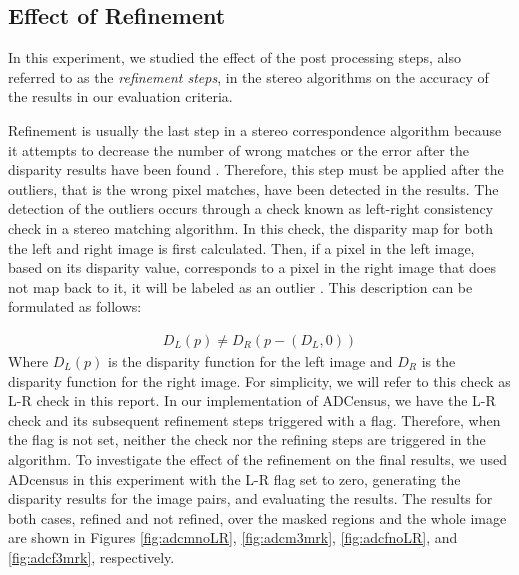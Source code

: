\subsection{Effect of Refinement}
In this experiment, we studied the effect of the post processing steps, also referred to as the \textit{refinement steps}, 
in the stereo algorithms on the accuracy of the results in our evaluation criteria. 

Refinement is usually the last step in a stereo correspondence algorithm because it attempts to decrease the 
number of wrong matches or the error after the disparity results have been found \cite{sch02}. Therefore, this step must be applied after the outliers, that is the wrong pixel matches, 
have been detected in the results.
The detection of the outliers occurs through a check known as left-right consistency check in a stereo matching algorithm. In this check, the disparity map for both
the left and right image is first calculated. Then, if a pixel in the left image, based on its disparity value, corresponds to a pixel in the right image
that does not map back to it, it will be labeled as an outlier \cite{sch02}. This description can be formulated as follows:

\begin{align}
D_{L}(p) \neq D_{R}(p-(D_{L},0))
\end{align}
\noindent
Where $D_{L}(p)$ is the disparity function for the left image and $D_{R}$ is the disparity function for the right image. \newline
For simplicity, we will refer
to this check as L-R check in this report.
In our implementation of ADCensus, we have the L-R check and its subsequent refinement steps triggered with a flag.
Therefore, when the flag is not set, neither the check nor the refining steps are triggered in the algorithm.
To investigate the effect of the refinement on the final results, we used 
ADcensus in this experiment with the L-R flag set to zero, generating the disparity results for the image pairs, and evaluating the results.
The results for both cases, refined and not refined, over the masked regions and the whole image are shown in Figures \ref{fig:adcmnoLR}, \ref{fig:adcm3mrk}, 
\ref{fig:adcfnoLR}, and \ref{fig:adcf3mrk}, respectively.

